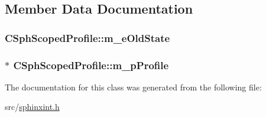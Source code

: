 \subsection{Member Data Documentation}
\hypertarget{classCSphScopedProfile_aa658aa76267b2c2d1495388134fa0f8f}{
\subsubsection[{m\-\_\-e\-Old\-State}]{ C\-Sph\-Scoped\-Profile\-::m\-\_\-e\-Old\-State\hspace{0.3cm}{\ttfamily [private]}}}\label{classCSphScopedProfile_aa658aa76267b2c2d1495388134fa0f8f}
\hypertarget{classCSphScopedProfile_ad09b4526c7899d122d0b9adea80fa635}{
\subsubsection[{m\-\_\-p\-Profile}]{$\ast$ C\-Sph\-Scoped\-Profile\-::m\-\_\-p\-Profile\hspace{0.3cm}{\ttfamily [private]}}}\label{classCSphScopedProfile_ad09b4526c7899d122d0b9adea80fa635}


The documentation for this class was generated from the following file\-:\begin{DoxyCompactItemize}
\item 
src/\hyperlink{sphinxint_8h}{sphinxint.\-h}\end{DoxyCompactItemize}
